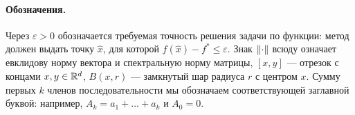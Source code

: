\paragraph{Обозначения.} Через $\varepsilon>0$ обозначается требуемая точность решения задачи по функции: метод должен выдать точку $\hat x$, для которой $f(\hat x)-f^\ast\le\varepsilon$. Знак $\lVert\cdot\rVert$ всюду означает евклидову норму вектора и спектральную норму матрицы, $[x,y]$ --- отрезок с концами $x,y\in\mathbb R^d$, $B(x,r)$ --- замкнутый шар радиуса $r$ с центром $x$. Сумму первых $k$ членов последовательности мы обозначаем соответствующей заглавной буквой: например, $A_k=a_1+\dots+a_k$ и $A_0=0$.
